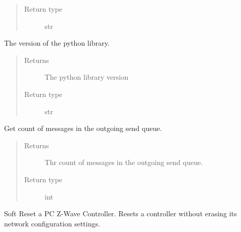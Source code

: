 \documentclass[letterpaper,10pt,english]{sphinxmanual}
\begin{document}
\begin{fulllineitems}
\begin{fulllineitems}
\begin{quote}
\begin{description}
\item[{Return type}] \leavevmode
str

\end{description}\end{quote}

\end{fulllineitems}


\begin{fulllineitems}
\label{controller:openzwave.controller.ZWaveController.python_library_version}
The version of the python library.
\begin{quote}\begin{description}
\item[{Returns}] \leavevmode
The python library version

\item[{Return type}] \leavevmode
str

\end{description}\end{quote}

\end{fulllineitems}


\begin{fulllineitems}
\label{controller:openzwave.controller.ZWaveController.send_queue_count}
Get count of messages in the outgoing send queue.
\begin{quote}\begin{description}
\item[{Returns}] \leavevmode
Thr count of messages in the outgoing send queue.

\item[{Return type}] \leavevmode
int

\end{description}\end{quote}

\end{fulllineitems}


\begin{fulllineitems}
\label{controller:openzwave.controller.ZWaveController.soft_reset}
Soft Reset a PC Z-Wave Controller.
Resets a controller without erasing its network configuration settings.


\end{fulllineitems}
\end{fulllineitems}
\end{document}
